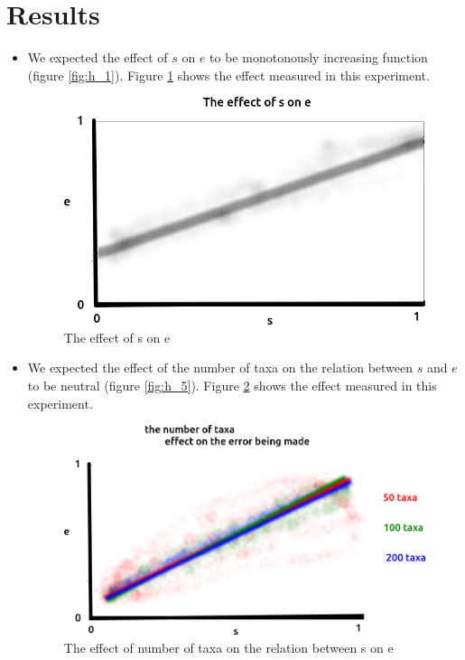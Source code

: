 \section{Results}
\begin{itemize}

\item We expected the effect of $s$ on $e$ to be monotonously increasing
function (figure \ref{fig:h_1}). Figure \ref{fig:1} shows the effect 
measured in this experiment. 

\begin{figure}[!htbp]
  \includegraphics[width=\textwidth]{fig_1.png}
  \caption{
    The effect of s on e
  }
  \label{fig:1}
\end{figure}

\item We expected the effect of the number of taxa on the relation
between $s$ and $e$ to be neutral (figure \ref{fig:h_5}). 
Figure \ref{fig:5} shows the effect 
measured in this experiment. 

\begin{figure}[!htbp]
  \includegraphics[width=\textwidth]{fig_5.png}
  \caption{
    The effect of number of taxa on the relation between s on e
  }
  \label{fig:5}
\end{figure}


\end{itemize}

